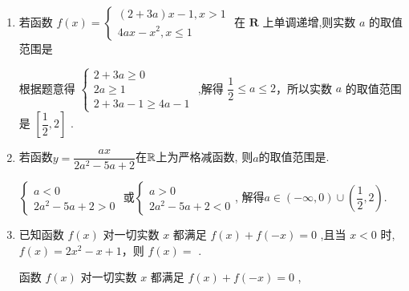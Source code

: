\begin{enumerate}
\begin{jieda}
        由 $\left\{  \begin{matrix}  - \dfrac{4a}{2} \geq  2 \\  4 + {8a} + 7 \geq  0 \end{matrix}\right.$ 解得 $- \dfrac{11}{8} \leq  a \leq   - 1$ .
    \end{jieda}
    \item 若函数 $f\left( x\right)  = \left\{  \begin{array}{l} \left( {2 + {3a}}\right) x - 1,x > 1 \\  {4ax} - {x}^{2},x \leq  1 \end{array}\right.$ 在 $\mathbf{R}$ 上单调递增,则实数 $a$ 的取值范围是
    \begin{jieda}
        根据题意得 $\left\{  \begin{array}{l} 2 + {3a} \geq 0 \\  {2a} \geq  1 \\  2 + {3a} - 1 \geq  {4a} - 1 \end{array}\right.$ ,解得 $\dfrac{1}{2} \leq  a \leq  2$，所以实数 $a$ 的取值范围是 $\left\lbrack  {\dfrac{1}{2},2}\right\rbrack$ .
    \end{jieda}
    \item 若函数$y=\dfrac{ax}{2a^2-5a+2}$在$\mathbb{R}$上为严格减函数, 则$a$的取值范围是. 
        \begin{jieda}
        $\begin{cases}
        a < 0\\
        2a^2-5a+2>0
        \end{cases}$
        或$\begin{cases}
        a > 0 \\
        2a^2-5a+2 < 0
        \end{cases}$, 
        解得$a \in (-\infty, 0) \cup \left(\dfrac{1}{2}, 2\right)$. 
        \end{jieda}
    \item 已知函数 $f\left( x\right)$ 对一切实数 $x$ 都满足 $f\left( x\right)  + f\left( {-x}\right)  = 0$ ,且当 $x < 0$ 时, $f\left( x\right)  = 2{x}^{2} - x + 1$，则 $f\left( x\right)  =$ .
    \begin{jieda}
        函数 $f\left( x\right)$ 对一切实数 $x$ 都满足 $f\left( x\right)  + f\left( {-x}\right)  = 0$ ,
        

\end{jieda}
\end{enumerate}

